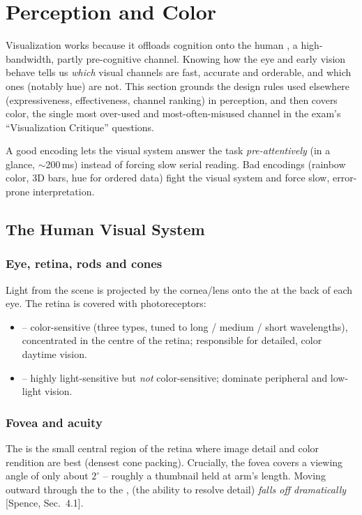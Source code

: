 \section{Perception and Color}

Visualization works because it offloads cognition onto the human , a high-bandwidth, partly pre-cognitive channel. Knowing how the eye
and early vision behave tells us \emph{which} visual channels are fast,
accurate and orderable, and which ones (notably hue) are not. This section
grounds the design rules used elsewhere (expressiveness, effectiveness, channel
ranking) in perception, and then covers color, the single most over-used and
most-often-misused channel in the exam's ``Visualization Critique'' questions.

\begin{keybox}
A good encoding lets the visual system answer the task \emph{pre-attentively}
(in a glance, $\sim$200\,ms) instead of forcing slow serial reading.
Bad encodings (rainbow color, 3D bars, hue for ordered data) fight the visual
system and force slow, error-prone interpretation.
\end{keybox}

\subsection{The Human Visual System}

\subsubsection{Eye, retina, rods and cones}
Light from the scene is projected by the cornea/lens onto the  at
the back of each eye. The retina is covered with photoreceptors:
\begin{itemize}
  \item {} -- color-sensitive (three types, tuned to long / medium /
    short wavelengths), concentrated in the centre of the retina; responsible
    for detailed, color daytime vision.
  \item {} -- highly light-sensitive but \emph{not} color-sensitive;
    dominate peripheral and low-light vision.
\end{itemize}

\subsubsection{Fovea and acuity}
The  is the small central region of the retina where image detail
and color rendition are best (densest cone packing). Crucially, the fovea
covers a viewing angle of only about \textbf{$2^\circ$} -- roughly a thumbnail
held at arm's length. Moving outward through the  to the
,  (the ability to resolve detail)
\emph{falls off dramatically} [Spence, Sec.~4.1].

